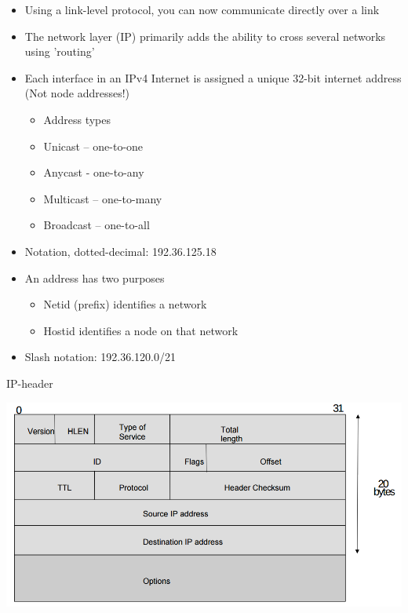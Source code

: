 \documentclass{beamer}
\begin{document}
\begin{frame}
  \begin{itemize}
  \item Using a link-level protocol, you can now communicate
    directly over a link
  \item The network layer (IP) primarily adds the ability to cross
    several networks using 'routing'
  \item Each interface in an IPv4 Internet is assigned a unique 32-bit
internet address (Not node addresses!)
  \begin{itemize}
\item Address types
\item Unicast – one-to-one
\item Anycast - one-to-any
\item Multicast – one-to-many
\item Broadcast – one-to-all
  \end{itemize}
\item Notation, dotted-decimal: 192.36.125.18
\item An address has two purposes
  \begin{itemize}
\item Netid (prefix) identifies a network
\item Hostid identifies a node on that network
  \end{itemize}
\item Slash notation: 192.36.120.0/21
  \end{itemize}
\end{frame}

\begin{frame}{IP-header}
  \begin{center}
    \includegraphics[width=0.9\linewidth]{IP-header}
  \end{center}
\end{frame}
\end{document}

